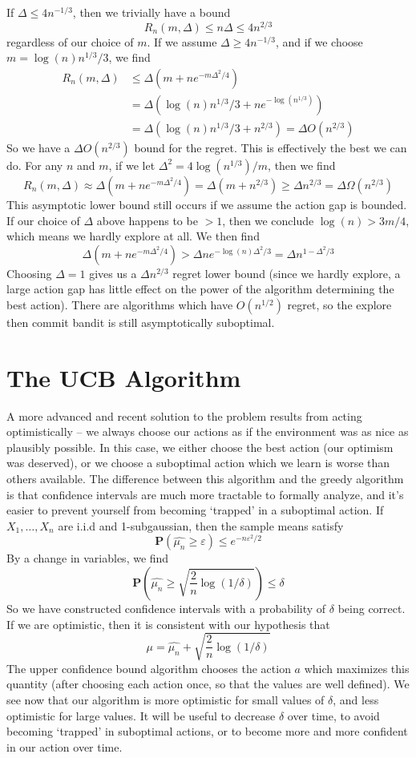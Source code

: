 If $\Delta \leq 4n^{-1/3}$, then we trivially have a bound
%
\[ R_n(m, \Delta) \leq n \Delta \leq 4n^{2/3} \]
%
regardless of our choice of $m$. If we assume $\Delta \geq 4n^{-1/3}$, and if we choose $m = \log(n) n^{1/3}/3$, we find
%
\begin{align*}
    R_n(m, \Delta) &\leq \Delta(m + n e^{-m \Delta^2/4})\\
    &= \Delta (\log(n) n^{1/3}/3 + n e^{- \log(n^{1/3})})\\
    &= \Delta(\log(n) n^{1/3}/3 + n^{2/3}) = \Delta O(n^{2/3})
\end{align*}
%
So we have a $\Delta O(n^{2/3})$ bound for the regret. This is effectively the best we can do. For any $n$ and $m$, if we let $\Delta^2 = 4 \log(n^{1/3})/m$, then we find
%
\[ R_n(m, \Delta) \approx \Delta (m + n e^{-m \Delta^2/4}) = \Delta(m + n^{2/3}) \geq \Delta n^{2/3} = \Delta \Omega(n^{2/3}) \]
%
This asymptotic lower bound still occurs if we assume the action gap is bounded. If our choice of $\Delta$ above happens to be $> 1$, then we conclude $\log(n) > 3m/4$, which means we hardly explore at all. We then find
%
\[ \Delta (m + n e^{-m \Delta^2/4}) > \Delta n e^{-\log(n) \Delta^2/3} = \Delta n^{1 - \Delta^2/3} \]
%
Choosing $\Delta = 1$ gives us a $\Delta n^{2/3}$ regret lower bound (since we hardly explore, a large action gap has little effect on the power of the algorithm determining the best action). There are algorithms which have $O(n^{1/2})$ regret, so the explore then commit bandit is still asymptotically suboptimal.

\section{The UCB Algorithm}

A more advanced and recent solution to the problem results from acting optimistically -- we always choose our actions as if the environment was as nice as plausibly possible. In this case, we either choose the best action (our optimism was deserved), or we choose a suboptimal action which we learn is worse than others available. The difference between this algorithm and the greedy algorithm is that confidence intervals are much more tractable to formally analyze, and it's easier to prevent yourself from becoming `trapped' in a suboptimal action. If $X_1, \dots, X_n$ are i.i.d and 1-subgaussian, then the sample means satisfy
%
\[ \mathbf{P}(\widehat{\mu_n} \geq \varepsilon) \leq e^{-n\varepsilon^2/2} \]
%
By a change in variables, we find
%
\[ \mathbf{P}\left(\widehat{\mu_n} \geq \sqrt{\frac{2}{n} \log(1/\delta)} \right) \leq \delta \]
%
So we have constructed confidence intervals with a probability of $\delta$ being correct. If we are optimistic, then it is consistent with our hypothesis that
%
\[ \mu = \widehat{\mu_n} + \sqrt{\frac{2}{n} \log(1/\delta)} \]
%
The upper confidence bound algorithm chooses the action $a$ which maximizes this quantity (after choosing each action once, so that the values are well defined). We see now that our algorithm is more optimistic for small values of $\delta$, and less optimistic for large values. It will be useful to decrease $\delta$ over time, to avoid becoming `trapped' in suboptimal actions, or to become more and more confident in our action over time.

